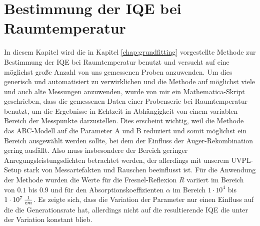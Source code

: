 \chapter{Bestimmung der IQE bei Raumtemperatur}

\label{chap:raum}
\thispagestyle{fancy}

In diesem Kapitel wird die in Kapitel \ref{chap:grundfitting} vorgestellte Methode zur Bestimmung der IQE bei Raumtemperatur benutzt und versucht auf eine möglichst große Anzahl von uns gemessenen Proben anzuwenden. 
\newline
Um dies generisch und automatisiert zu verwirklichen und die Methode auf möglichst viele und auch alte Messungen anzuwenden, wurde von mir ein Mathematica-Skript geschrieben, dass die gemessenen Daten einer Probenserie bei Raumtemperatur benutzt, um die Ergebnisse in Echtzeit in Abhängigkeit von einem variablen Bereich der Messpunkte darzustellen. Dies erscheint wichtig, weil die Methode das ABC-Modell auf die Parameter A und B reduziert und somit möglichst ein Bereich ausgewählt werden sollte, bei dem der Einfluss der Auger-Rekombination gering ausfällt. Also muss insbesondere der Bereich geringer Anregungsleistungsdichten betrachtet werden, der allerdings mit unserem UVPL-Setup stark von Messartefakten und Rauschen beeinflusst ist.
\newline
Für die Anwendung der Methode wurden die Werte für die Fresnel-Reflexion $R$ variiert im Bereich von 
$0.1$ bis $0.9$ und für den Absorptionskoeffizienten $\alpha$ im Bereich $1\cdot 10^4$ bis $1\cdot 10^7 \thinspace \frac{1}{cm}$. Es zeigte sich, dass die Variation der Parameter nur einen Einfluss auf die die Generationsrate hat, allerdings nicht auf die resultierende IQE die unter der Variation konstant blieb. 
